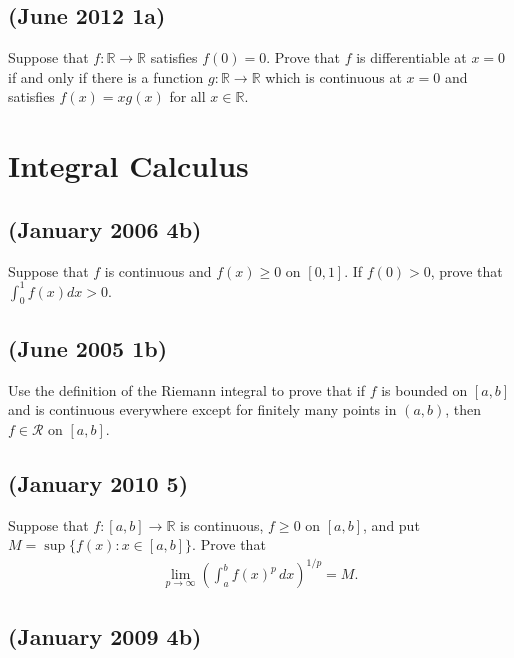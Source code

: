 \hypertarget{june-2012-1a}{%
\subsection{(June 2012 1a)}\label{june-2012-1a}}

Suppose that \(f:\mathbb{R}\to\mathbb{R}\) satisfies \(f(0)=0\). Prove
that \(f\) is differentiable at \(x=0\) if and only if there is a
function \(g:\mathbb{R}\to\mathbb{R}\) which is continuous at \(x=0\)
and satisfies \(f(x)=xg(x)\) for all \(x\in\mathbb{R}\).

\hypertarget{integral-calculus}{%
\section{Integral Calculus}\label{integral-calculus}}

\hypertarget{january-2006-4b}{%
\subsection{(January 2006 4b)}\label{january-2006-4b}}

Suppose that \(f\) is continuous and \(f(x)\geq 0\) on \([0,1]\). If
\(f(0)>0\), prove that \(\int_0^1 f(x)dx>0\).

\hypertarget{june-2005-1b}{%
\subsection{(June 2005 1b)}\label{june-2005-1b}}

Use the definition of the Riemann integral to prove that if \(f\) is
bounded on \([a,b]\) and is continuous everywhere except for finitely
many points in \((a,b)\), then \(f\in\mathscr{R}\) on \([a,b]\).

\hypertarget{january-2010-5}{%
\subsection{(January 2010 5)}\label{january-2010-5}}

Suppose that \(f:[a,b]\to\mathbb{R}\) is continuous, \(f\geq 0\) on
\([a,b]\), and put \(M=\sup\{f(x):x\in[a,b]\}\). Prove that
\begin{align*}\lim_{p\to\infty}\left(\int_a^b f(x)^p\,dx\right)^{1/p}=M.\end{align*}

\hypertarget{january-2009-4b}{%
\subsection{(January 2009 4b)}\label{january-2009-4b}}

